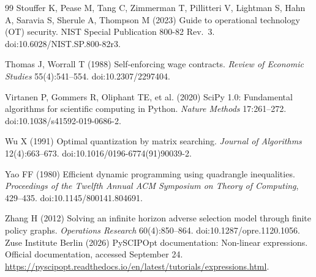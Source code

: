 \begin{thebibliography}{99}
Stouffer K, Pease M, Tang C, Zimmerman T, Pillitteri V, Lightman S, Hahn A, Saravia S, Sherule A, Thompson M (2023) Guide to operational technology (OT) security. NIST Special Publication 800-82 Rev.~3. doi:10.6028/NIST.SP.800-82r3.

Thomas J, Worrall T (1988) Self-enforcing wage contracts. \emph{Review of Economic Studies} 55(4):541--554. doi:10.2307/2297404.

Virtanen P, Gommers R, Oliphant TE, et al. (2020) SciPy 1.0: Fundamental algorithms for scientific computing in Python. \emph{Nature Methods} 17:261--272. doi:10.1038/s41592-019-0686-2.

Wu X (1991) Optimal quantization by matrix searching. \emph{Journal of Algorithms} 12(4):663--673. doi:10.1016/0196-6774(91)90039-2.

Yao FF (1980) Efficient dynamic programming using quadrangle inequalities. \emph{Proceedings of the Twelfth Annual ACM Symposium on Theory of Computing}, 429--435. doi:10.1145/800141.804691.

Zhang H (2012) Solving an infinite horizon adverse selection model through finite policy graphs. \emph{Operations Research} 60(4):850--864. doi:10.1287/opre.1120.1056.
Zuse Institute Berlin (2026) PySCIPOpt documentation: Non-linear expressions. Official documentation, accessed September 24. \url{https://pyscipopt.readthedocs.io/en/latest/tutorials/expressions.html}.
\end{thebibliography}
